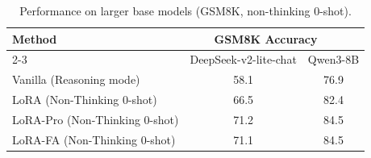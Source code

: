 \begin{table}[ht]
\caption{Performance on larger base models (GSM8K, non-thinking 0-shot).}
\label{tab:larger-model}
\begin{center}
\addtolength{\tabcolsep}{-4pt}
\begin{tabular}{lcc} 
\hline
\multirow{2}{*}{Method} & \multicolumn{2}{c}{GSM8K Accuracy~ ~} \\ 
\cline{2-3}
 & DeepSeek-v2-lite-chat & Qwen3-8B \\ 
\hline
Vanilla (Reasoning mode) & 58.1 & 76.9 \\
LoRA (Non-Thinking 0-shot) & 66.5 & 82.4 \\
LoRA-Pro (Non-Thinking 0-shot) & 71.2 & 84.5 \\
LoRA-FA (Non-Thinking 0-shot) & 71.1 & 84.5 \\
\hline
\end{tabular}
\end{center}
\end{table}